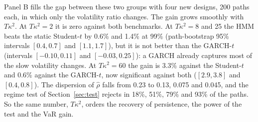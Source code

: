 \documentclass[12pt,letterpaper]{article}
\theoremstyle{plain}
\theoremstyle{remark}
\begin{document}
Panel B fills the gap between these two groups with four new designs, 200 paths each, in which only the volatility ratio changes. The gain grows smoothly with $T\kappa^2$. At $T\kappa^2=2$ it is zero against both benchmarks. At $T\kappa^2=8$ and 25 the HMM beats the static Student-$t$ by 0.6\% and 1.4\% at 99\% (path-bootstrap 95\% intervals $[0.4,0.7]$ and $[1.1,1.7]$), but it is not better than the GARCH-$t$ (intervals $[-0.10,0.11]$ and $[-0.03,0.25]$): a GARCH already captures most of the slow volatility changes. At $T\kappa^2=60$ the gain is 3.3\% against the Student-$t$ and 0.6\% against the GARCH-$t$, now significant against both ($[2.9,3.8]$ and $[0.4,0.8]$). The dispersion of $\hat\rho$ falls from 0.23 to 0.13, 0.075 and 0.045, and the regime test of Section~\ref{sec:test} rejects in 18\%, 51\%, 79\% and 93\% of the paths. So the same number, $T\kappa^2$, orders the recovery of persistence, the power of the test and the VaR gain.
\end{document}
